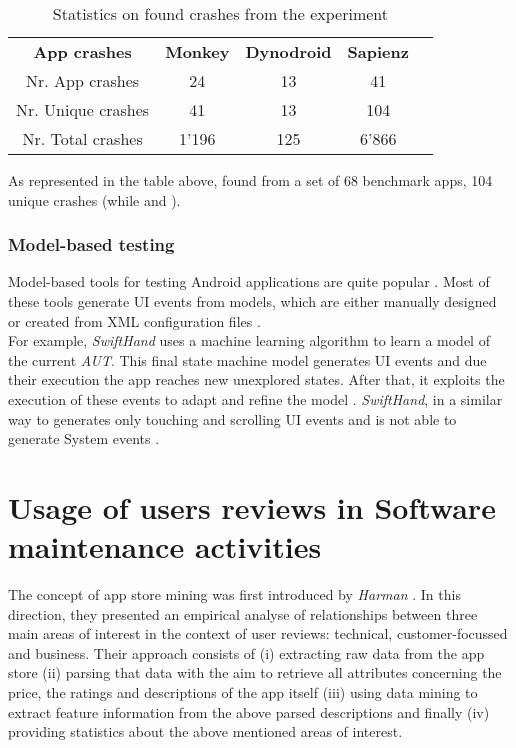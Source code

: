 \begin{table}[tb]
\centering
\caption{Statistics on found crashes from the \sapienz experiment}
\label{sapienz experiment results}
\begin{tabular}{|c|c|c|c|l}
\cline{1-4}
\textbf{App crashes} & \textbf{Monkey} & \textbf{Dynodroid} & \textbf{Sapienz} &  \\ \cline{1-4}
Nr. App crashes      & 24              & 13                 & 41               &  \\ \cline{1-4}
Nr. Unique crashes   & 41              & 13                 & 104              &  \\ \cline{1-4}
Nr. Total crashes    & 1'196           & 125                & 6'866             &  \\ \cline{1-4}
\end{tabular}
\end{table}
As represented in the table above, \sapienz found from a set of 68 benchmark apps, 104 unique crashes (while  and ).

\subsubsection{Model-based testing}
Model-based tools for testing Android applications are quite popular \cite{sapienz}. Most of these tools \cite{mobiguitar, mining, guiripper,swift} generate UI events from models, which are either manually designed or created from XML configuration files \cite{sapienz}. \\
For example, \textit{SwiftHand} \cite{swift} uses a machine learning algorithm to learn a model of the current \textit{AUT}. This final state machine model \cite{areWeThereYet} generates UI events and due their execution the app reaches new unexplored states. After that, it exploits the execution of these events to adapt and refine the model \cite{swift}. \textit{SwiftHand}, in a similar way to \monkey generates only touching and scrolling UI events and is not able to generate System events \cite{areWeThereYet}.

\section{Usage of users reviews in Software maintenance activities}
\label{section:review_usage}
The concept of app store mining was first introduced by \textit{Harman} \etal
\cite{appstoremining}. In this direction, they presented an empirical analyse of relationships between three main areas of interest in the context of user reviews: technical, customer-focussed and business. 
Their approach consists of (i) extracting raw data from the app store (ii) parsing that data with the aim to retrieve all attributes concerning the price, the ratings and descriptions of the app itself (iii) using data mining to extract feature information from the above parsed descriptions and finally (iv) providing statistics about the above mentioned areas of interest.  

